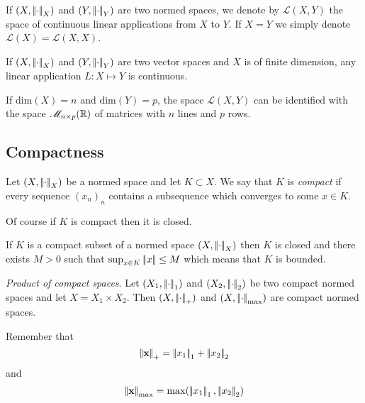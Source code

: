 \documentclass{article}
\begin{document}
\begin{definition}
	If $(X,\dnorm_X)$ and $(Y,\dnorm_Y)$ are two normed spaces, we denote by $\mathcal{L}(X,Y)$ the space of continuous linear applications from $X$ to $Y$. If $X=Y$ we simply denote $\mathcal{L}(X)=\mathcal{L}(X,X)$.
\end{definition}
\begin{proposition}
	If $(X,\dnorm_X)$ and $(Y,\dnorm_Y)$ are two vector spaces and $X$ is of finite dimension, any linear application $L:X\mapsto Y$ is continuous.
\end{proposition}
\begin{remark}
	If $\mathrm{dim}(X)=n$ and $\mathrm{dim}(Y)=p$, the space $\mathscr{L}(X,Y)$ can be identified with the space $\mathscr{M}_{n\times p}(\R)$ of matrices with $n$ lines and $p$ rows.
\end{remark}
\subsection{Compactness}
\begin{definition}
	Let $(X,\dnorm_X)$ be a normed space and let $K\subset X$. We say that $K$ is \emph{compact} if every sequence ${(x_n)}_n$ contains a subsequence which converges to some $x\in K$.
\end{definition}Of course if $K$ is compact then it is closed.\begin{lemma}
If $K$ is a compact subset of a normed space $(X,\dnorm_X)$ then $K$ is closed and there exists $M>0$ such that $\sup_{x\in K}\norm{x}\leq M$ which means that $K$ is bounded.
\end{lemma}\begin{proposition}
\emph{Product of compact spaces}. Let $(X_1,\dnorm_1)$ and $(X_2,\dnorm_2)$ be two compact normed spaces and let $X=X_1\times X_2$. Then $(X,\dnorm_+)$ and $(X,\dnorm_{\max })$ are compact normed spaces.
\end{proposition}
Remember that 
\begin{equation*}
	\norm{\mathbf{x}}_+=\norm{x_1}_1+\norm{x_2}_2
\end{equation*}
and
\begin{equation*}
	\norm{\mathbf{x}}_{\max}=\max(\norm{x_1}_1,\norm{x_2}_2)
\end{equation*}
\end{document}

